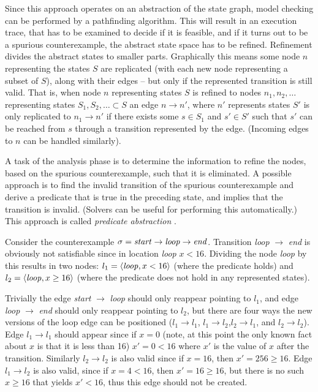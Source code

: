 Since this approach operates on an abstraction of the state graph, model checking can be performed by a pathfinding algorithm. This will result in an execution trace, that has to be examined to decide if it is feasible, and if it turns out to be a spurious counterexample, the abstract state space has to be refined. Refinement divides the abstract states to smaller parts. Graphically this means some node $n$ representing the states $S$ are replicated (with each new node representing a subset of $S$), along with their edges -- but only if the represented transition is still valid. That is, when node $n$ representing states $S$ is refined to nodes $n_1,n_2,\dots$ representing states $S_1,S_2,\dots \subset S$ an edge $n \to n'$, where $n'$ represents states $S'$ is only replicated to $n_1 \to n'$ if there exists some $s \in S_1$ and $s' \in S'$ such that $s'$ can be reached from $s$ through a transition represented by the edge. (Incoming edges to $n$ can be handled similarly).

A task of the analysis phase is to determine the information to refine the nodes, based on the spurious counterexample, such that it is eliminated. A possible approach is to find the invalid transition of the spurious counterexample and derive a predicate that is true in the preceding state, and implies that the transition is invalid. (Solvers can be useful for performing this automatically.) This approach is called \emph{predicate abstraction} \cite{Graf97a}.

 \begin{example}
 	Consider the counterexample $\sigma = \text{\emph{start}} \to \text{\emph{loop}} \to \text{\emph{end}}$. Transition \emph{loop} $\to$ \emph{end} is obviously not satisfiable since in location \emph{loop} $x<16$. Dividing the node \emph{loop} by this results in two nodes: $l_1=\langle \text{\emph{loop}}, x<16 \rangle$ (where the predicate holds) and $l_2=\langle \text{\emph{loop}}, x \geq 16 \rangle$ (where the predicate does not hold in any represented states).
 	
 	Trivially the edge \emph{start} $\to$ \emph{loop} should only reappear pointing to $l_1$, and edge \emph{loop} $\to$ \emph{end} should only reappear pointing to $l_2$, but there are four ways the new versions of the loop edge can be positioned ($l_1 \to l_1$, $l_1 \to l_2$,$l_2 \to l_1$, and $l_2 \to l_2$). Edge $l_1 \to l_1$ should appear since if $x=0$ (note, at this point the only known fact about $x$ is that it is less than 16) $x'=0<16$ where $x'$ is the value of $x$ after the transition. Similarly $l_2 \to l_2$ is also valid since if $x=16$, then $x'=256 \geq 16$. Edge $l_1 \to l_2$ is also valid, since if $x=4<16$, then $x'=16 \geq 16$, but there is no such $x \geq 16$ that yields $x'<16$, thus this edge should not be created. 
 \end{example}


